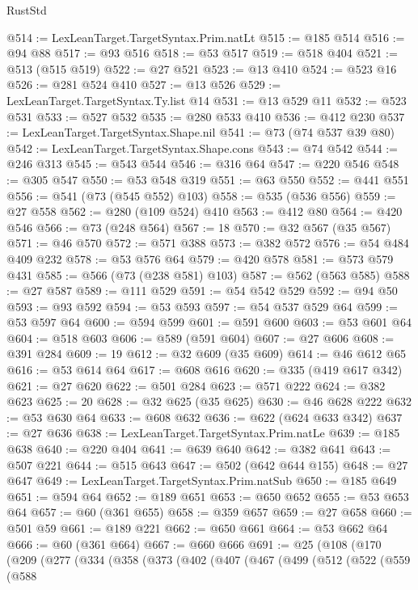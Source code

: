 \begin{lexlean}{RustStd}
\begin{coremodule}
@514 := LexLeanTarget.TargetSyntax.Prim.natLt
@515 := @185 @514
@516 := @94 @88
@517 := @93 @516
@518 := @53 @517
@519 := @518 @404
@521 := @513 (@515 @519)
@522 := @27 @521
@523 := @13 @410
@524 := @523 @16
@526 := @281 @524 @410
@527 := @13 @526
@529 := LexLeanTarget.TargetSyntax.Ty.list @14
@531 := @13 @529 @11
@532 := @523 @531
@533 := @527 @532
@535 := @280 @533 @410
@536 := @412 @230
@537 := LexLeanTarget.TargetSyntax.Shape.nil
@541 := @73 (@74 @537 @39 @80)
@542 := LexLeanTarget.TargetSyntax.Shape.cons
@543 := @74 @542
@544 := @246 @313
@545 := @543 @544
@546 := @316 @64
@547 := @220 @546
@548 := @305 @547
@550 := @53 @548 @319
@551 := @63 @550
@552 := @441 @551
@556 := @541 (@73 (@545 @552) @103)
@558 := @535 (@536 @556)
@559 := @27 @558
@562 := @280 (@109 @524) @410
@563 := @412 @80
@564 := @420 @546
@566 := @73 (@248 @564)
@567 := 18
@570 := @32 @567 (@35 @567)
@571 := @46 @570
@572 := @571 @388
@573 := @382 @572
@576 := @54 @484 @409 @232
@578 := @53 @576 @64
@579 := @420 @578
@581 := @573 @579 @431
@585 := @566 (@73 (@238 @581) @103)
@587 := @562 (@563 @585)
@588 := @27 @587
@589 := @111 @529
@591 := @54 @542 @529
@592 := @94 @50
@593 := @93 @592
@594 := @53 @593
@597 := @54 @537 @529 @64
@599 := @53 @597 @64
@600 := @594 @599
@601 := @591 @600
@603 := @53 @601 @64
@604 := @518 @603
@606 := @589 (@591 @604)
@607 := @27 @606
@608 := @391 @284
@609 := 19
@612 := @32 @609 (@35 @609)
@614 := @46 @612 @65
@616 := @53 @614 @64
@617 := @608 @616
@620 := @335 (@419 @617 @342)
@621 := @27 @620
@622 := @501 @284
@623 := @571 @222
@624 := @382 @623
@625 := 20
@628 := @32 @625 (@35 @625)
@630 := @46 @628 @222
@632 := @53 @630 @64
@633 := @608 @632
@636 := @622 (@624 @633 @342)
@637 := @27 @636
@638 := LexLeanTarget.TargetSyntax.Prim.natLe
@639 := @185 @638
@640 := @220 @404
@641 := @639 @640
@642 := @382 @641
@643 := @507 @221
@644 := @515 @643
@647 := @502 (@642 @644 @155)
@648 := @27 @647
@649 := LexLeanTarget.TargetSyntax.Prim.natSub
@650 := @185 @649
@651 := @594 @64
@652 := @189 @651
@653 := @650 @652
@655 := @53 @653 @64
@657 := @60 (@361 @655)
@658 := @359 @657
@659 := @27 @658
@660 := @501 @59
@661 := @189 @221
@662 := @650 @661
@664 := @53 @662 @64
@666 := @60 (@361 @664)
@667 := @660 @666
@691 := @25
    (@108
      (@170
        (@209
          (@277
            (@334
              (@358
                (@373
                  (@402
                    (@407
                      (@467
                        (@499
                          (@512
                            (@522
                              (@559
                                (@588

\end{coremodule}
\end{lexlean}
